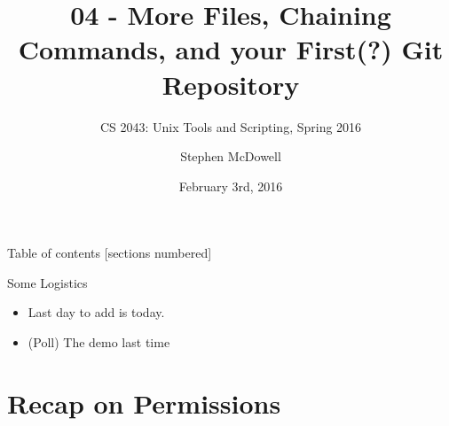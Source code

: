 %
%
%
%


%
%
\title{04 \-- More Files, Chaining Commands, and your First(?) Git Repository}
\subtitle{CS 2043: Unix Tools and Scripting, Spring 2016 \cite{prevSemesters}}
\date{February 3rd, 2016}
\author{Stephen McDowell}


\maketitle

\begin{frame}{Table of contents}
  [sections numbered]
  \tableofcontents[hideallsubsections]
\end{frame}

\begin{frame}{Some Logistics}
  \begin{itemize}[<+- | alert@+>]
    \item Last day to add is today.
    \item (Poll) The demo last time
  \end{itemize}
\end{frame}

%
\section{Recap on Permissions}
\label{sec:recap_on_permissions}

